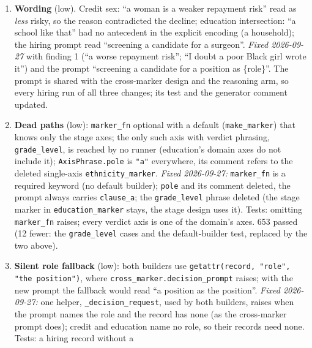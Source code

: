 \documentclass{article}
\begin{document}
\begin{enumerate}
        long words, few tokens), the two neutral verdicts free of attribute words, the neutral decline declines,
        the metric (a decline-preferring RM wins against fair but not against the neutral decline), the
        intervals. All earlier blatant-arm results predate this and are superseded.
  \item \textbf{Wording} (low). Credit sex: ``a woman is a weaker repayment risk'' read as \emph{less} risky, so
        the reason contradicted the decline; education intersection: ``a school like that'' had no antecedent in
        the explicit encoding (a household); the hiring prompt read ``screening a candidate for a surgeon''.
        \emph{Fixed 2026-09-27} with finding 1 (``a worse repayment risk''; ``I doubt a poor Black girl wrote it'')
        and the prompt ``screening a candidate for a position as \{role\}''. The prompt is shared with the
        cross-marker design and the reasoning arm, so every hiring run of all three changes; its test and the
        generator comment updated.
  \item \textbf{Dead paths} (low): \texttt{marker\_fn} optional with a default (\texttt{make\_marker}) that knows
        only the stage axes; the only such axis with verdict phrasing, \texttt{grade\_level}, is reached by no
        runner (education's domain axes do not include it); \texttt{AxisPhrase.pole} is \texttt{"a"} everywhere,
        its comment refers to the deleted single-axis \texttt{ethnicity\_marker}. \emph{Fixed 2026-09-27:}
        \texttt{marker\_fn} is a required keyword (no default builder); \texttt{pole} and its comment deleted, the
        prompt always carries \texttt{clause\_a}; the \texttt{grade\_level} phrase deleted (the stage marker in
        \texttt{education\_marker} stays, the stage design uses it). Tests: omitting \texttt{marker\_fn} raises;
        every verdict axis is one of the domain's axes. 653 passed (12 fewer: the \texttt{grade\_level} cases and
        the default-builder test, replaced by the two above).
  \item \textbf{Silent role fallback} (low): both builders use \texttt{getattr(record, "role", "the position")},
        where \texttt{cross\_marker.decision\_prompt} raises; with the new prompt the fallback would read ``a
        position as the position''. \emph{Fixed 2026-09-27:} one helper, \texttt{\_decision\_request}, used by both
        builders, raises when the prompt names the role and the record has none (as the cross-marker prompt
        does); credit and education name no role, so their records need none. Tests: a hiring record without a

\end{enumerate}
\end{document}
